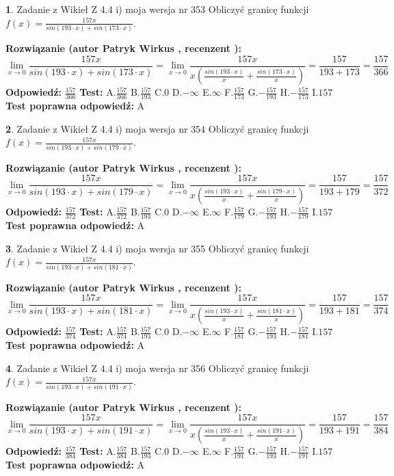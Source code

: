 \documentclass[12pt, a4paper]{article}
\theoremstyle{definition} %
\newtheorem{zad}{}
\newcommand{\zadStart}[1]{\begin{zad}#1\newline}
\newcommand{\zadStop}{\end{zad}}
\newcommand{\rozwStart}[2]{\noindent \textbf{Rozwiązanie (autor #1 , recenzent #2): }\newline}
\newcommand{\rozwStop}{\newline}
\newcommand{\odpStart}{\noindent \textbf{Odpowiedź:}\newline}
\newcommand{\odpStop}{\newline}
\newcommand{\testStart}{\noindent \textbf{Test:}\newline}
\newcommand{\testStop}{\newline}
\newcommand{\kluczStart}{\noindent \textbf{Test poprawna odpowiedź:}\newline}
\newcommand{\kluczStop}{\newline}
\begin{document}
\zadStart{Zadanie z Wikieł Z 4.4 i) moja wersja nr 353}
Obliczyć granicę funkcji $f(x)=\frac{157x}{sin(193\cdot x) +sin(173\cdot x)}$.
\zadStop
\rozwStart{Patryk Wirkus}{}
$$\lim\limits_{x\to 0}\frac{157x}{sin(193\cdot x) +sin(173\cdot x)}=\lim\limits_{x\to 0}\frac{157x}{x(\frac{sin(193\cdot x)}{x}+\frac{sin(173\cdot x)}{x})}=\frac{157}{193+173} = \frac{157}{366}$$
\rozwStop
\odpStart
$\frac{157}{366}$
\odpStop
\testStart
A.$\frac{157}{366}$
B.$\frac{157}{193}$
C.$0$
D.$-\infty$
E.$\infty$
F.$\frac{157}{173}$
G.$-\frac{157}{193}$
H.$-\frac{157}{173}$
I.$157$
\testStop
\kluczStart
A
\kluczStop



\zadStart{Zadanie z Wikieł Z 4.4 i) moja wersja nr 354}
Obliczyć granicę funkcji $f(x)=\frac{157x}{sin(193\cdot x) +sin(179\cdot x)}$.
\zadStop
\rozwStart{Patryk Wirkus}{}
$$\lim\limits_{x\to 0}\frac{157x}{sin(193\cdot x) +sin(179\cdot x)}=\lim\limits_{x\to 0}\frac{157x}{x(\frac{sin(193\cdot x)}{x}+\frac{sin(179\cdot x)}{x})}=\frac{157}{193+179} = \frac{157}{372}$$
\rozwStop
\odpStart
$\frac{157}{372}$
\odpStop
\testStart
A.$\frac{157}{372}$
B.$\frac{157}{193}$
C.$0$
D.$-\infty$
E.$\infty$
F.$\frac{157}{179}$
G.$-\frac{157}{193}$
H.$-\frac{157}{179}$
I.$157$
\testStop
\kluczStart
A
\kluczStop



\zadStart{Zadanie z Wikieł Z 4.4 i) moja wersja nr 355}
Obliczyć granicę funkcji $f(x)=\frac{157x}{sin(193\cdot x) +sin(181\cdot x)}$.
\zadStop
\rozwStart{Patryk Wirkus}{}
$$\lim\limits_{x\to 0}\frac{157x}{sin(193\cdot x) +sin(181\cdot x)}=\lim\limits_{x\to 0}\frac{157x}{x(\frac{sin(193\cdot x)}{x}+\frac{sin(181\cdot x)}{x})}=\frac{157}{193+181} = \frac{157}{374}$$
\rozwStop
\odpStart
$\frac{157}{374}$
\odpStop
\testStart
A.$\frac{157}{374}$
B.$\frac{157}{193}$
C.$0$
D.$-\infty$
E.$\infty$
F.$\frac{157}{181}$
G.$-\frac{157}{193}$
H.$-\frac{157}{181}$
I.$157$
\testStop
\kluczStart
A
\kluczStop



\zadStart{Zadanie z Wikieł Z 4.4 i) moja wersja nr 356}
Obliczyć granicę funkcji $f(x)=\frac{157x}{sin(193\cdot x) +sin(191\cdot x)}$.
\zadStop
\rozwStart{Patryk Wirkus}{}
$$\lim\limits_{x\to 0}\frac{157x}{sin(193\cdot x) +sin(191\cdot x)}=\lim\limits_{x\to 0}\frac{157x}{x(\frac{sin(193\cdot x)}{x}+\frac{sin(191\cdot x)}{x})}=\frac{157}{193+191} = \frac{157}{384}$$
\rozwStop
\odpStart
$\frac{157}{384}$
\odpStop
\testStart
A.$\frac{157}{384}$
B.$\frac{157}{193}$
C.$0$
D.$-\infty$
E.$\infty$
F.$\frac{157}{191}$
G.$-\frac{157}{193}$
H.$-\frac{157}{191}$
I.$157$
\testStop
\kluczStart
A
\kluczStop
\end{document}
